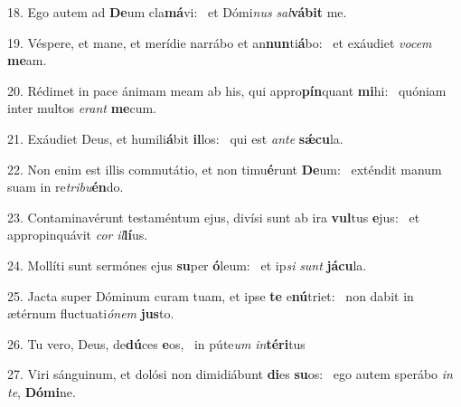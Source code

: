 18. Ego autem ad \textbf{De}um cla\textbf{má}vi: \ast\  et Dómi\textit{nus} \textit{sal}\textbf{vá}\textbf{bit} me.\

19. Véspere, et mane, et merídie narrábo et an\textbf{nun}ti\textbf{á}bo: \ast\  et exáudiet \textit{vo}\textit{cem} \textbf{me}am.\

20. Rédimet in pace ánimam meam ab his, qui appro\textbf{pín}quant \textbf{mi}hi: \ast\  quóniam inter multos \textit{e}\textit{rant} \textbf{me}cum.\

21. Exáudiet Deus, et humili\textbf{á}bit \textbf{il}los: \ast\  qui est \textit{an}\textit{te} \textbf{sǽ}\textbf{cu}la.\

22. Non enim est illis commutátio, et non timu\textbf{é}runt \textbf{De}um: \ast\  exténdit manum suam in re\textit{tri}\textit{bu}\textbf{én}do.\

23. Contaminavérunt testaméntum ejus, divísi sunt ab ira \textbf{vul}tus \textbf{e}jus: \ast\  et appropinquávit \textit{cor} \textit{il}\textbf{lí}us.\

24. Mollíti sunt sermónes ejus \textbf{su}per \textbf{ó}leum: \ast\  et ip\textit{si} \textit{sunt} \textbf{já}\textbf{cu}la.\

25. Jacta super Dóminum curam tuam, et ipse \textbf{te} e\textbf{nú}triet: \ast\  non dabit in ætérnum fluctuati\textit{ó}\textit{nem} \textbf{jus}to.\

26. Tu vero, Deus, de\textbf{dú}ces \textbf{e}os, \ast\  in púte\textit{um} \textit{in}\textbf{tér}\textbf{i}tus\

27. Viri sánguinum, et dolósi non dimidiábunt \textbf{di}es \textbf{su}os: \ast\  ego autem sperábo \textit{in} \textit{te}, \textbf{Dó}\textbf{mi}ne.\


